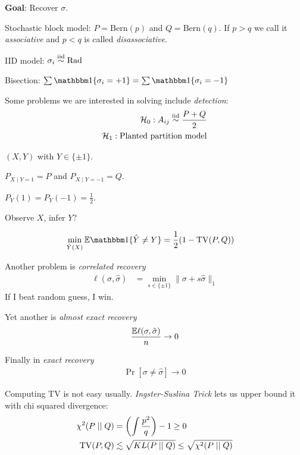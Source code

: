 \textbf{Goal}: Recover $\sigma$.

Stochastic block model: $P = \text{Bern}(p)$ and $Q = \text{Bern}(q)$.
If $p > q$ we call it \emph{associative} and $p < q$ is called \emph{disassociative}.

IID model: $\sigma_i \overset{\text{iid}}{\sim} \text{Rad}$

Bisection: $\sum \ind\{\sigma_i = + 1\} = \sum \ind\{\sigma_i = -1\}$


Some problems we are interested in solving include \emph{detection}:
\begin{align}
  \mathcal{H}_0 : A_{ij} \overset{\text{iid}}{\sim} \frac{P + Q}{2} \\
  \mathcal{H}_1 : \text{Planted partition model}
\end{align}

\begin{lemma}
  $(X,Y)$ with $Y \in \{\pm1\}$.

  $P_{X \mid Y = 1} = P$ and $P_{X \mid Y = -1} = Q$.

  $P_Y(1) = P_Y(-1) = \frac{1}{2}$.

  Observe $X$, infer $Y$?

  \begin{align}
    \min_{\hat{Y}(X)} \ex \ind\{\hat{Y} \neq Y\} &= \frac{1}{2} ( 1 - \TV(P,Q) )
  \end{align}
\end{lemma}

Another problem is \emph{correlated recovery}
\begin{align}
  \ell(\sigma, \hat\sigma) &= \min_{s \in \{\pm 1\}} \|\sigma + s \hat\sigma\|_1
\end{align}
If I beat random guess, I win.

Yet another is \emph{almost exact recovery}
\begin{align}
  \frac{\mathbb{E} \ell(\sigma, \hat\sigma)}{n} \to 0
\end{align}

Finally in \emph{exact recovery}
\begin{align}
  \Pr[\sigma \neq \hat\sigma] \to 0
\end{align}

Computing TV is not easy usually. \emph{Ingster-Suslina Trick}
lets us upper bound it with chi squared divergence:
\begin{align}
  \chi^2(P \mid\mid Q) &= \left(\int \frac{p^2}{q} \right) - 1 \geq 0 \\
  \operatorname{TV}(P, Q) &\lesssim \sqrt{KL(P\mid\mid Q)} \leq \sqrt{\chi^2(P \mid\mid Q)}
\end{align}


